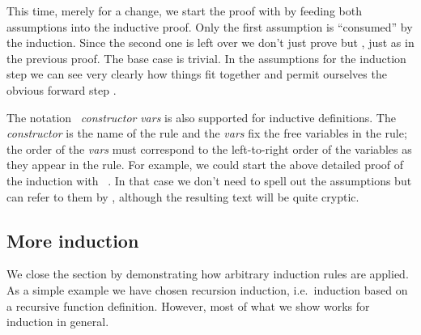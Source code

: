 \begin{isabellebody}
\isamarkupfalse%
%
\endisatagproof
{\isafoldproof}%
%
\isadelimproof
%
\endisadelimproof
%
\begin{isamarkuptext}%
\noindent
This time, merely for a change, we start the proof with by feeding both
assumptions into the inductive proof. Only the first assumption is
``consumed'' by the induction.
Since the second one is left over we don't just prove  but
, just as in the previous proof.
The base case is trivial. In the assumptions for the induction step we can
see very clearly how things fit together and permit ourselves the
obvious forward step .

The notation ~\isa{(}\emph{constructor} \emph{vars}\isa{)}
is also supported for inductive definitions. The \emph{constructor} is the
name of the rule and the \emph{vars} fix the free variables in the
rule; the order of the \emph{vars} must correspond to the
left-to-right order of the variables as they appear in the rule.
For example, we could start the above detailed proof of the induction
with ~. In that case we don't need
to spell out the assumptions but can refer to them by ,
although the resulting text will be quite cryptic.

\subsection{More induction}

We close the section by demonstrating how arbitrary induction
rules are applied. As a simple example we have chosen recursion
induction, i.e.\ induction based on a recursive function
definition. However, most of what we show works for induction in
general.


\end{isamarkuptext}
\end{isabellebody}
